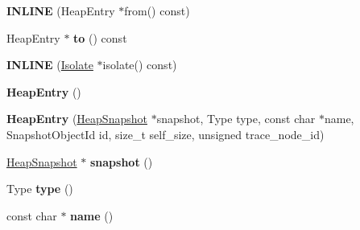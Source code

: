 \begin{DoxyCompactItemize}
\item 
{\bfseries I\+N\+L\+I\+NE} (Heap\+Entry $\ast$from() const)\hypertarget{classv8_1_1internal_1_1_b_a_s_e___e_m_b_e_d_d_e_d_a150637da3d41a4b52059d92e418dc725}{}\label{classv8_1_1internal_1_1_b_a_s_e___e_m_b_e_d_d_e_d_a150637da3d41a4b52059d92e418dc725}

\item 
Heap\+Entry $\ast$ {\bfseries to} () const \hypertarget{classv8_1_1internal_1_1_b_a_s_e___e_m_b_e_d_d_e_d_a0e28ef81821edf56785edb9365680c05}{}\label{classv8_1_1internal_1_1_b_a_s_e___e_m_b_e_d_d_e_d_a0e28ef81821edf56785edb9365680c05}

\item 
{\bfseries I\+N\+L\+I\+NE} (\hyperlink{classv8_1_1internal_1_1_isolate}{Isolate} $\ast$isolate() const)\hypertarget{classv8_1_1internal_1_1_b_a_s_e___e_m_b_e_d_d_e_d_abe48395c5889049313cd023c1f5b0589}{}\label{classv8_1_1internal_1_1_b_a_s_e___e_m_b_e_d_d_e_d_abe48395c5889049313cd023c1f5b0589}

\item 
{\bfseries Heap\+Entry} ()\hypertarget{classv8_1_1internal_1_1_b_a_s_e___e_m_b_e_d_d_e_d_af1859bd77b58cb55cbfce46ee437d857}{}\label{classv8_1_1internal_1_1_b_a_s_e___e_m_b_e_d_d_e_d_af1859bd77b58cb55cbfce46ee437d857}

\item 
{\bfseries Heap\+Entry} (\hyperlink{classv8_1_1internal_1_1_heap_snapshot}{Heap\+Snapshot} $\ast$snapshot, Type type, const char $\ast$name, Snapshot\+Object\+Id id, size\+\_\+t self\+\_\+size, unsigned trace\+\_\+node\+\_\+id)\hypertarget{classv8_1_1internal_1_1_b_a_s_e___e_m_b_e_d_d_e_d_a96f7c2219b3f9392111cc2576ec6ec47}{}\label{classv8_1_1internal_1_1_b_a_s_e___e_m_b_e_d_d_e_d_a96f7c2219b3f9392111cc2576ec6ec47}

\item 
\hyperlink{classv8_1_1internal_1_1_heap_snapshot}{Heap\+Snapshot} $\ast$ {\bfseries snapshot} ()\hypertarget{classv8_1_1internal_1_1_b_a_s_e___e_m_b_e_d_d_e_d_ad2664b38b6dd34e82e58fbfa4cae7f05}{}\label{classv8_1_1internal_1_1_b_a_s_e___e_m_b_e_d_d_e_d_ad2664b38b6dd34e82e58fbfa4cae7f05}

\item 
Type {\bfseries type} ()\hypertarget{classv8_1_1internal_1_1_b_a_s_e___e_m_b_e_d_d_e_d_a25f7abd8b21979640c08b8966dbb71c8}{}\label{classv8_1_1internal_1_1_b_a_s_e___e_m_b_e_d_d_e_d_a25f7abd8b21979640c08b8966dbb71c8}

\item 
const char $\ast$ {\bfseries name} ()\hypertarget{classv8_1_1internal_1_1_b_a_s_e___e_m_b_e_d_d_e_d_ad2b9e1f8acd17603feaae79288e9fb1c}{}\label{classv8_1_1internal_1_1_b_a_s_e___e_m_b_e_d_d_e_d_ad2b9e1f8acd17603feaae79288e9fb1c}


\end{DoxyCompactItemize}
